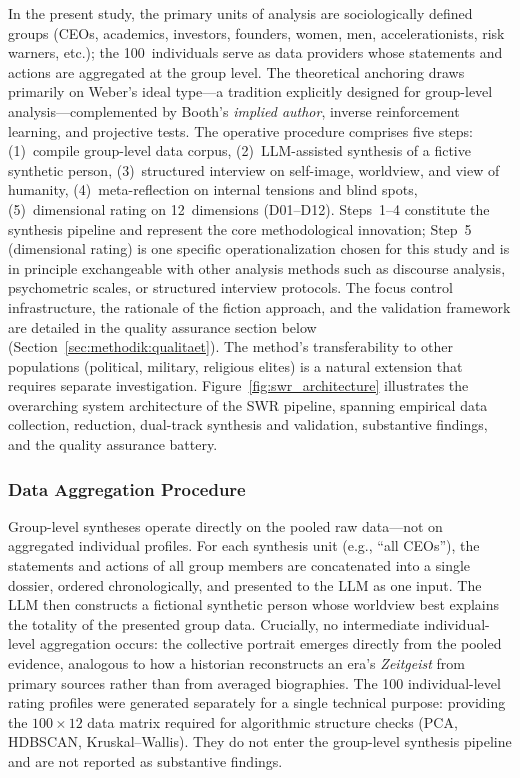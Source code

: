 \documentclass[12pt,a4paper]{article}
\begin{document}
In the present study, the primary units of analysis are sociologically defined groups (CEOs, academics, investors, founders, women, men, accelerationists, risk warners, etc.); the 100~individuals serve as data providers whose statements and actions are aggregated at the group level. The theoretical anchoring draws primarily on Weber's ideal type---a tradition explicitly designed for group-level analysis---complemented by Booth's \emph{implied author}, inverse reinforcement learning, and projective tests. The operative procedure comprises five steps: (1)~compile group-level data corpus, (2)~LLM-assisted synthesis of a fictive synthetic person, (3)~structured interview on self-image, worldview, and view of humanity, (4)~meta-reflection on internal tensions and blind spots, (5)~dimensional rating on 12~dimensions (D01--D12). Steps~1--4 constitute the synthesis pipeline and represent the core methodological innovation; Step~5 (dimensional rating) is one specific operationalization chosen for this study and is in principle exchangeable with other analysis methods such as discourse analysis, psychometric scales, or structured interview protocols. The focus control infrastructure, the rationale of the fiction approach, and the validation framework are detailed in the quality assurance section below (Section~\ref{sec:methodik:qualitaet}). The method's transferability to other populations (political, military, religious elites) is a natural extension that requires separate investigation. Figure~\ref{fig:swr_architecture} illustrates the overarching system architecture of the SWR pipeline, spanning empirical data collection, reduction, dual-track synthesis and validation, substantive findings, and the quality assurance battery.

\subsubsection{Data Aggregation Procedure}

Group-level syntheses operate directly on the pooled raw data---not on aggregated individual profiles. For each synthesis unit (e.g., ``all CEOs''), the statements and actions of all group members are concatenated into a single dossier, ordered chronologically, and presented to the LLM as one input. The LLM then constructs a fictional synthetic person whose worldview best explains the totality of the presented group data. Crucially, no intermediate individual-level aggregation occurs: the collective portrait emerges directly from the pooled evidence, analogous to how a historian reconstructs an era's \emph{Zeitgeist} from primary sources rather than from averaged biographies. The 100 individual-level rating profiles were generated separately for a single technical purpose: providing the $100 \times 12$ data matrix required for algorithmic structure checks (PCA, HDBSCAN, Kruskal--Wallis). They do not enter the group-level synthesis pipeline and are not reported as substantive findings.
\end{document}
